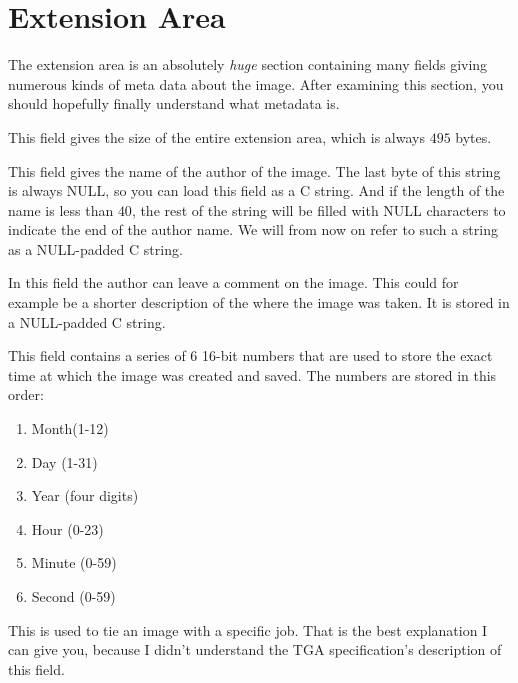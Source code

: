 \section{Extension Area}
\label{sec:extension-area}

The extension area is an absolutely \textit{huge} section containing
many fields giving numerous kinds of meta data about the image. After
examining this section, you should hopefully finally understand what
metadata is.


This field gives the size of the entire extension area, which is
always $495$ bytes.


This field gives the name of the author of the image. The last byte of
this string is always NULL, so you can load this field as a C
string. And if the length of the name is less than $40$, the rest of
the string will be filled with NULL characters to indicate the end of
the author name. We will from now on refer to such a string as a
NULL-padded C string.


In this field the author can leave a comment on the image. This could
for example be a shorter description of the where the image was
taken. It is stored in a NULL-padded C string.


This field contains a series of 6 16-bit numbers that are used to
store the exact time at which the image was created and saved. The
numbers are stored in this order:

\begin{enumerate}
\item Month(1-12)
\item Day (1-31)
\item Year (four digits)
\item Hour (0-23)
\item Minute (0-59)
\item Second (0-59)
\end{enumerate}


This is used to tie an image with a specific job. That is the best
explanation I can give you, because I didn't understand the TGA
specification's description of this field.



